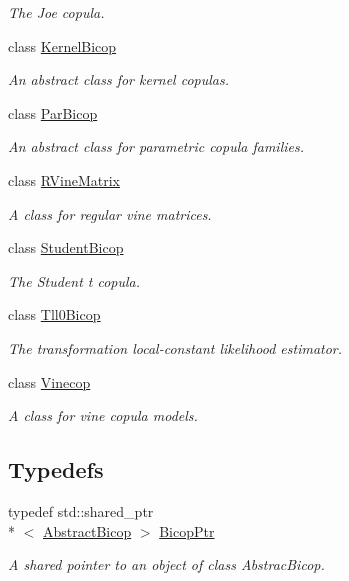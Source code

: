 \begin{DoxyCompactItemize}
\begin{DoxyCompactList}\small\item\em The Joe copula. \end{DoxyCompactList}\item 
class \hyperlink{classvinecopulib_1_1_kernel_bicop}{Kernel\+Bicop}
\begin{DoxyCompactList}\small\item\em An abstract class for kernel copulas. \end{DoxyCompactList}\item 
class \hyperlink{classvinecopulib_1_1_par_bicop}{Par\+Bicop}
\begin{DoxyCompactList}\small\item\em An abstract class for parametric copula families. \end{DoxyCompactList}\item 
class \hyperlink{classvinecopulib_1_1_r_vine_matrix}{R\+Vine\+Matrix}
\begin{DoxyCompactList}\small\item\em A class for regular vine matrices. \end{DoxyCompactList}\item 
class \hyperlink{classvinecopulib_1_1_student_bicop}{Student\+Bicop}
\begin{DoxyCompactList}\small\item\em The Student t copula. \end{DoxyCompactList}\item 
class \hyperlink{classvinecopulib_1_1_tll0_bicop}{Tll0\+Bicop}
\begin{DoxyCompactList}\small\item\em The transformation local-\/constant likelihood estimator. \end{DoxyCompactList}\item 
class \hyperlink{classvinecopulib_1_1_vinecop}{Vinecop}
\begin{DoxyCompactList}\small\item\em A class for vine copula models. \end{DoxyCompactList}\end{DoxyCompactItemize}
\subsection*{Typedefs}
\begin{DoxyCompactItemize}
\item 
\hypertarget{namespacevinecopulib_afd73d02952b845883499cbbda1996204}{typedef std\+::shared\+\_\+ptr\\*
$<$ \hyperlink{classvinecopulib_1_1_abstract_bicop}{Abstract\+Bicop} $>$ \hyperlink{namespacevinecopulib_afd73d02952b845883499cbbda1996204}{Bicop\+Ptr}}\label{namespacevinecopulib_afd73d02952b845883499cbbda1996204}

\begin{DoxyCompactList}\small\item\em A shared pointer to an object of class Abstrac\+Bicop. \end{DoxyCompactList}\end{DoxyCompactItemize}
